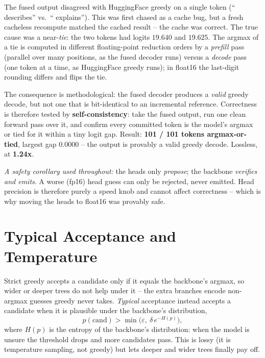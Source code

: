 \documentclass[12pt, a4paper]{article}
\begin{document}
The fused output disagreed with HuggingFace greedy on a single token (`` describes'' vs.\
`` explains''). This was first chased as a cache bug, but a fresh cacheless recompute matched
the cached result -- the cache was correct. The true cause was a near-\emph{tie}: the two
tokens had logits $19.640$ and $19.625$. The argmax of a tie is computed in different
floating-point reduction orders by a \emph{prefill} pass (parallel over many positions, as the
fused decoder runs) versus a \emph{decode} pass (one token at a time, as HuggingFace greedy
runs); in float16 the last-digit rounding differs and flips the tie.

The consequence is methodological: the fused decoder produces a \emph{valid} greedy decode, but
not one that is bit-identical to an incremental reference. Correctness is therefore tested by
\textbf{self-consistency}: take the fused output, run one clean forward pass over it, and
confirm every committed token is the model's argmax or tied for it within a tiny logit gap.
Result: \textbf{101 / 101 tokens argmax-or-tied}, largest gap $0.0000$ -- the output is provably
a valid greedy decode. Lossless, at \textbf{1.24x}.

\textit{A safety corollary used throughout:} the heads only \emph{propose}; the backbone
\emph{verifies and emits}. A worse (fp16) head guess can only be rejected, never emitted. Head
precision is therefore purely a speed knob and cannot affect correctness -- which is why moving
the heads to float16 was provably safe.

\section{Typical Acceptance and Temperature}

Strict greedy accepts a candidate only if it equals the backbone's argmax, so wider or deeper
trees do not help under it -- the extra branches encode non-argmax guesses greedy never takes.
\emph{Typical} acceptance \cite{cai2024} instead accepts a candidate when it is plausible under
the backbone's distribution,
\[
p(\text{cand}) > \min\!\big(\varepsilon,\ \delta\, e^{-H(p)}\big),
\]
where $H(p)$ is the entropy of the backbone's distribution: when the model is unsure the
threshold drops and more candidates pass. This is lossy (it is temperature sampling, not
greedy) but lets deeper and wider trees finally pay off.
\end{document}
